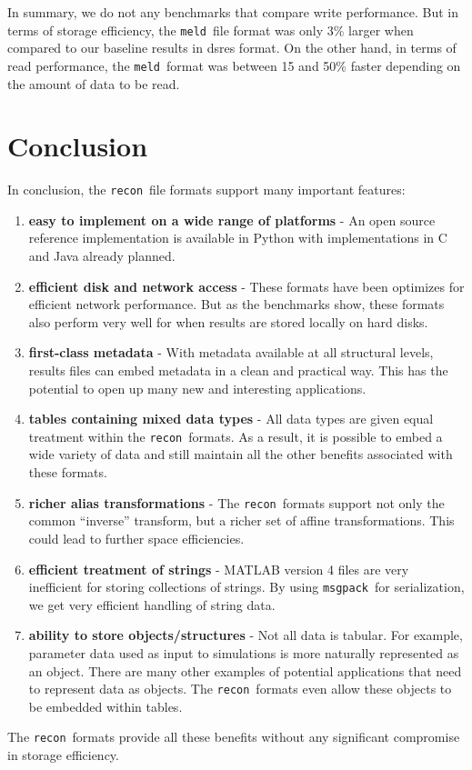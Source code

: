 \documentclass[11pt,a4paper,twocolumn]{article}
\newcommand{\recon}{\texttt{recon}}
\newcommand{\meld}{\texttt{meld}}
\newcommand{\msgpack}{\texttt{msgpack}}
\begin{document}
In summary, we do not any benchmarks that compare write performance.
But in terms of storage efficiency, the \meld\ file format was only
3\% larger when compared to our baseline results in dsres format.  On
the other hand, in terms of read performance, the \meld\ format was
between 15 and 50\% faster depending on the amount of data to be read.

\section{Conclusion}
\label{sec:conclusion}

In conclusion, the \recon\ file formats support many important features:
\begin{enumerate}
\item \textbf{easy to implement on a wide range of platforms} - An open
  source reference implementation is available in Python with
  implementations in C and Java already planned.
\item \textbf{efficient disk and network access} - These formats have been
  optimizes for efficient network performance.  But as the benchmarks
  show, these formats also perform very well for when results are
  stored locally on hard disks.
\item \textbf{first-class metadata} - With metadata available at all
  structural levels, results files can embed metadata in a clean and
  practical way.  This has the potential to open up many new and
  interesting applications.
\item \textbf{tables containing mixed data types} - All data types are
  given equal treatment within the \recon\ formats.  As a result, it
  is possible to embed a wide variety of data and still maintain all
  the other benefits associated with these formats.
\item \textbf{richer alias transformations} - The \recon\ formats support
  not only the common ``inverse'' transform, but a richer set of
  affine transformations.  This could lead to further space
  efficiencies.
\item \textbf{efficient treatment of strings} - MATLAB version 4 files are
  very inefficient for storing collections of strings.  By using
  \msgpack\ for serialization, we get very efficient handling of
  string data.
\item \textbf{ability to store objects/structures} - Not all data is
  tabular.  For example, parameter data used as input to simulations
  is more naturally represented as an object.  There are many other
  examples of potential applications that need to represent data as
  objects.  The \recon\ formats even allow these objects to be
  embedded within tables.
\end{enumerate}

The \recon\ formats provide all these benefits without any significant
compromise in storage efficiency.


\end{document}
